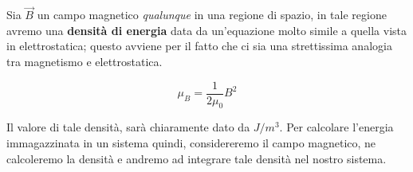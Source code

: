 Sia $\vec{B}$ un campo magnetico \textit{qualunque} in una regione di spazio, in tale regione avremo una \textbf{densità di energia} data da un'equazione molto simile a quella vista in elettrostatica; questo avviene per il fatto che ci sia una strettissima analogia tra magnetismo e elettrostatica. 

\begin{large}
	\begin{equation}\label{eq_densita_energia_campo_magnetico}
		\mu_B = \frac{1}{2\mu_0} B^2
	\end{equation}
\end{large}

Il valore di tale densità, sarà chiaramente dato da $J/m^3$. Per calcolare l'energia immagazzinata in un sistema quindi, considereremo il campo magnetico, ne calcoleremo la densità e andremo ad integrare tale densità nel nostro sistema.